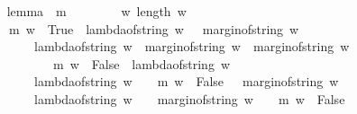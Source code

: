 \begin{isabellebody}
\endisatagproof
{\isafoldproof}%
%
\isadelimproof
\isanewline
%
\endisadelimproof
\ \ \isanewline
{}\isamarkupfalse%
\ lemma{\isacharunderscore}{}{\isacharunderscore}{}{}\ {\isacharcolon}\ {\isachardoublequoteopen}{\isacharparenleft}m\ {\isacharbrackleft}{\isacharbrackright}\ {\isacharequal}\ {\isacharparenleft}{}{\isacharcomma}{}{\isacharparenright}{\isacharparenright}\ {\isasymand}\ \isanewline
\ \ {\isacharparenleft}{\isasymforall}\ w{\isachardot}\ {\isacharparenleft}{\isacharparenleft}length\ w\ {\isachargreater}\ {}{\isacharparenright}\ {\isasymlongrightarrow}\ {\isacharparenleft}\ \isanewline
\ \ \ \ {\isacharparenleft}m\ {\isacharparenleft}w\ {\isacharat}\ {\isacharbrackleft}True{\isacharbrackright}{\isacharparenright}\ {\isacharequal}\ {\isacharparenleft}lambda{\isacharunderscore}of{\isacharunderscore}string\ w\ {\isacharplus}\ {}{\isacharcomma}\ margin{\isacharunderscore}of{\isacharunderscore}string\ w\ {\isacharplus}\ {}{\isacharparenright}{\isacharparenright}\ \isanewline
\ \ \ \ \ {\isasymand}\ \ \ {\isacharparenleft}{\isacharparenleft}lambda{\isacharunderscore}of{\isacharunderscore}string\ w\ {\isachargreater}\ margin{\isacharunderscore}of{\isacharunderscore}string\ w{\isacharparenright}\ {\isasymand}\ {\isacharparenleft}margin{\isacharunderscore}of{\isacharunderscore}string\ w\ {\isacharequal}\ {}{\isacharparenright}\isanewline
\ \ \ \ \ \ \ \ \ \ {\isasymlongrightarrow}\ {\isacharparenleft}m\ {\isacharparenleft}w\ {\isacharat}\ {\isacharbrackleft}False{\isacharbrackright}{\isacharparenright}\ {\isacharequal}\ {\isacharparenleft}lambda{\isacharunderscore}of{\isacharunderscore}string\ w\ {\isacharminus}\ {}{\isacharcomma}\ {}{\isacharparenright}{\isacharparenright}{\isacharparenright}\isanewline
\ \ \ \ \ {\isasymand}\ \ \ {\isacharparenleft}lambda{\isacharunderscore}of{\isacharunderscore}string\ w\ {\isacharequal}\ {}\ {\isasymlongrightarrow}\ {\isacharparenleft}m\ {\isacharparenleft}w\ {\isacharat}\ {\isacharbrackleft}False{\isacharbrackright}{\isacharparenright}\ {\isacharequal}\ {\isacharparenleft}{}{\isacharcomma}\ margin{\isacharunderscore}of{\isacharunderscore}string\ w\ {\isacharminus}\ {}{\isacharparenright}{\isacharparenright}{\isacharparenright}\isanewline
\ \ \ \ \ {\isasymand}\ \ \ {\isacharparenleft}lambda{\isacharunderscore}of{\isacharunderscore}string\ w\ {\isachargreater}\ {}\ {\isasymand}\ margin{\isacharunderscore}of{\isacharunderscore}string\ w\ {\isasymnoteq}\ {}\ {\isasymlongrightarrow}\ {\isacharparenleft}m\ {\isacharparenleft}w\ {\isacharat}\ {\isacharbrackleft}False{\isacharbrackright}{\isacharparenright}\ \isanewline

\end{isabellebody}
